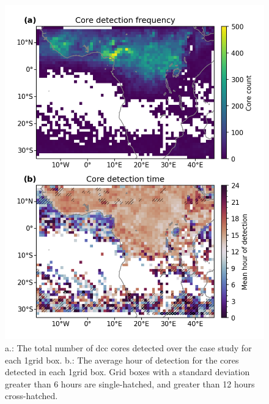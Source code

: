 \begin{figure}[tp]
    \includegraphics[width=\textwidth]{figures/chapter4_08.png}
    \caption[
    Number of detected cores and average hour of core detection
    ]{
    a.: The total number of \acrshort{dcc} cores detected over the case study for each 1\textdegree grid box. b.: The average hour of detection for the cores detected in each 1\textdegree grid box. Grid boxes with a standard deviation greater than 6 hours are single-hatched, and greater than 12 hours cross-hatched.
    }
    \label{fig:seviri_map_dists}
\end{figure}



